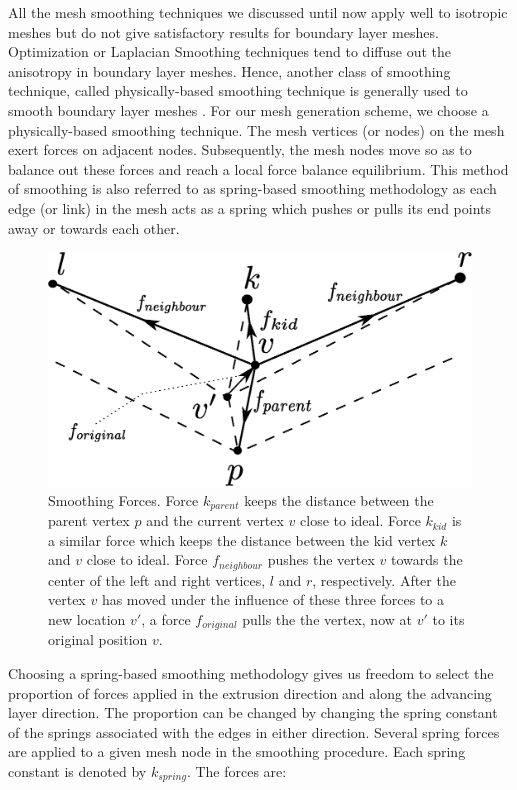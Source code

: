 All the mesh smoothing techniques we discussed until now apply well to isotropic meshes but do not give satisfactory results for boundary layer meshes. Optimization or Laplacian Smoothing techniques tend to diffuse out the anisotropy in boundary layer meshes. Hence, another class of smoothing technique, called physically-based smoothing technique is generally used to smooth boundary layer meshes \cite{numerow2017mixed, liu2016automatic}. For our mesh generation scheme, we choose a physically-based smoothing technique. The mesh vertices (or nodes) on the mesh exert forces on adjacent nodes. Subsequently, the mesh nodes move so as to balance out these forces and reach a local force balance equilibrium. This method of smoothing is also referred to as spring-based smoothing methodology as each edge (or link) in the mesh acts as a spring which pushes or pulls its end points away or towards each other.

\begin{figure}
\centering
\includegraphics[width=0.7\linewidth]{img/m2/smoothing/smoothing.eps}
\caption{Smoothing Forces. Force $k_{parent}$ keeps the distance between the parent vertex $p$ and the current vertex $v$ close to ideal. Force $k_{kid}$ is a similar force which keeps the distance between the kid vertex $k$ and $v$ close to ideal. Force $f_{neighbour}$ pushes the vertex $v$ towards the center of the left and right vertices, $l$ and $r$, respectively. After the vertex $v$ has moved under the influence of these three forces to a new location $v'$, a force $f_{original}$ pulls the the vertex, now at $v'$ to its original position $v$.}
\label{smoothingForces}
\end{figure}

Choosing a spring-based smoothing methodology gives us freedom to select the proportion of forces applied in the extrusion direction and along the advancing layer direction. The proportion can be changed by changing the spring constant of the springs associated with the edges in either direction. Several spring forces are applied to a given mesh node in the smoothing procedure. Each spring constant is denoted by $k_{spring}$. The forces are:


